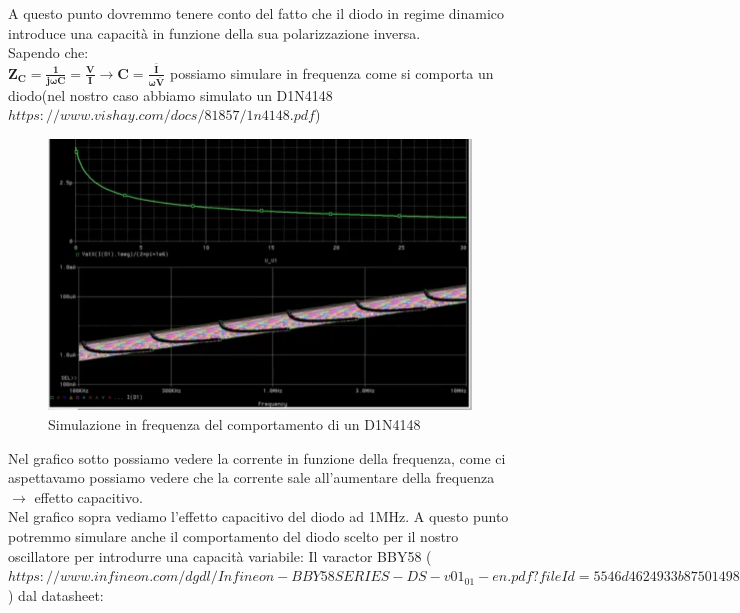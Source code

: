 \documentclass{article}
\begin{document}
A questo punto dovremmo tenere conto del fatto che il diodo in regime dinamico introduce una capacità in funzione della sua polarizzazione inversa.\\
Sapendo che:\\  \LARGE$\bm{Z_C=\frac{1}{j \omega C}=\frac{V}{I} \rightarrow C=\frac{\bar{I}}{\omega \bar{V}}}$ possiamo simulare in frequenza come si comporta un diodo(nel nostro caso abbiamo simulato un D1N4148 $https://www.vishay.com/docs/81857/1n4148.pdf$)
~\begin{figure}[H]
\includegraphics[width=\textwidth]{D1N4148.png}
\centering
\caption{Simulazione in frequenza del comportamento di un D1N4148}
\label{fig:foo}
\end{figure}
Nel grafico sotto possiamo vedere la corrente in funzione della frequenza, come ci aspettavamo possiamo vedere che la corrente sale all'aumentare della frequenza $\rightarrow$ effetto capacitivo.\\Nel grafico sopra vediamo l'effetto capacitivo del diodo ad 1MHz.
A questo punto potremmo simulare anche il comportamento del diodo scelto per il nostro oscillatore per introdurre una capacità variabile:  Il varactor BBY58 ($https://www.infineon.com/dgdl/Infineon-BBY58SERIES-DS-v01_01-en.pdf?fileId=5546d4624933b8750149880de2927e14$) dal datasheet: 
\end{document}
